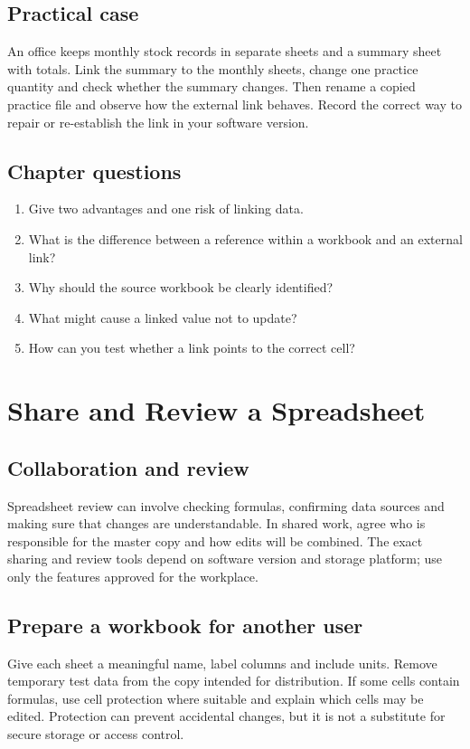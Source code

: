 \documentclass[11pt,openany,oneside]{book}
\begin{document}
\section{Practical case}
An office keeps monthly stock records in separate sheets and a summary sheet with totals. Link the summary to the monthly sheets, change one practice quantity and check whether the summary changes. Then rename a copied practice file and observe how the external link behaves. Record the correct way to repair or re-establish the link in your software version.
\section{Chapter questions}
\begin{enumerate}\item Give two advantages and one risk of linking data.\item What is the difference between a reference within a workbook and an external link?\item Why should the source workbook be clearly identified?\item What might cause a linked value not to update?\item How can you test whether a link points to the correct cell?\end{enumerate}

\chapter{Share and Review a Spreadsheet}
\section{Collaboration and review}
Spreadsheet review can involve checking formulas, confirming data sources and making sure that changes are understandable. In shared work, agree who is responsible for the master copy and how edits will be combined. The exact sharing and review tools depend on software version and storage platform; use only the features approved for the workplace.
\section{Prepare a workbook for another user}
Give each sheet a meaningful name, label columns and include units. Remove temporary test data from the copy intended for distribution. If some cells contain formulas, use cell protection where suitable and explain which cells may be edited. Protection can prevent accidental changes, but it is not a substitute for secure storage or access control.
\end{document}
